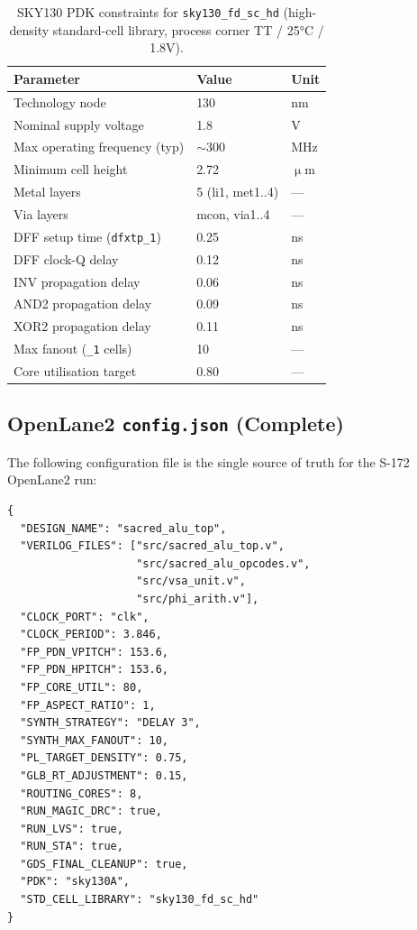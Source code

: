 \begin{table}[H]
\centering
\caption{SKY130 PDK constraints for \texttt{sky130\_fd\_sc\_hd}
  (high-density standard-cell library, process corner TT / 25°C / 1.8V).}
\label{tab:72:pdk}
\small
\begin{tabular}{lll}
\toprule
Parameter & Value & Unit \\
\midrule
Technology node        & 130      & nm \\
Nominal supply voltage & 1.8      & V \\
Max operating frequency (typ) & $\sim$300 & MHz \\
Minimum cell height    & 2.72     & $\upmu$m \\
Metal layers           & 5 (li1, met1..4) & — \\
Via layers             & mcon, via1..4 & — \\
DFF setup time (\texttt{dfxtp\_1}) & 0.25 & ns \\
DFF clock-Q delay      & 0.12     & ns \\
INV propagation delay  & 0.06     & ns \\
AND2 propagation delay & 0.09     & ns \\
XOR2 propagation delay & 0.11     & ns \\
Max fanout (\texttt{\_1} cells) & 10 & — \\
Core utilisation target & 0.80 & — \\
\bottomrule
\end{tabular}
\end{table}

\subsection{OpenLane2 \texttt{config.json} (Complete)}
\label{subsec:72:config-json}

The following configuration file is the single source of truth for
the S-172 OpenLane2 run:

\begin{verbatim}
{
  "DESIGN_NAME": "sacred_alu_top",
  "VERILOG_FILES": ["src/sacred_alu_top.v",
                    "src/sacred_alu_opcodes.v",
                    "src/vsa_unit.v",
                    "src/phi_arith.v"],
  "CLOCK_PORT": "clk",
  "CLOCK_PERIOD": 3.846,
  "FP_PDN_VPITCH": 153.6,
  "FP_PDN_HPITCH": 153.6,
  "FP_CORE_UTIL": 80,
  "FP_ASPECT_RATIO": 1,
  "SYNTH_STRATEGY": "DELAY 3",
  "SYNTH_MAX_FANOUT": 10,
  "PL_TARGET_DENSITY": 0.75,
  "GLB_RT_ADJUSTMENT": 0.15,
  "ROUTING_CORES": 8,
  "RUN_MAGIC_DRC": true,
  "RUN_LVS": true,
  "RUN_STA": true,
  "GDS_FINAL_CLEANUP": true,
  "PDK": "sky130A",
  "STD_CELL_LIBRARY": "sky130_fd_sc_hd"
}
\end{verbatim}

